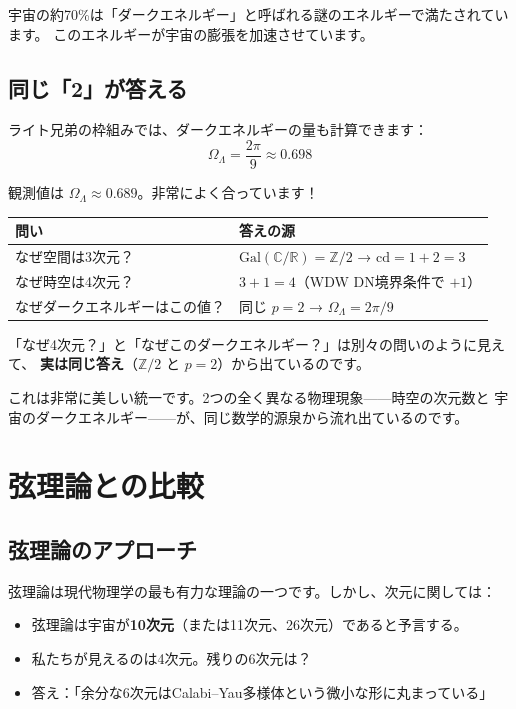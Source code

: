 \documentclass[12pt,a4paper]{article}
\begin{document}
宇宙の約70\%は「ダークエネルギー」と呼ばれる謎のエネルギーで満たされています。
このエネルギーが宇宙の膨張を加速させています。

\subsection{同じ「2」が答える}

ライト兄弟の枠組みでは、ダークエネルギーの量も計算できます：
\[
  \Omega_\Lambda = \frac{2\pi}{9} \approx 0.698
\]

観測値は $\Omega_\Lambda \approx 0.689$。非常によく合っています！

\begin{keypoint}[統一的な答え]
\begin{center}
\begin{tabular}{ll}
\toprule
\textbf{問い} & \textbf{答えの源} \\
\midrule
なぜ空間は3次元？ & $\mathrm{Gal}(\mathbb{C}/\mathbb{R}) = \mathbb{Z}/2$
→ $\mathrm{cd} = 1+2 = 3$ \\
なぜ時空は4次元？ & $3 + 1 = 4$（WDW DN境界条件で $+1$）\\
なぜダークエネルギーはこの値？ & 同じ $p=2$ → $\Omega_\Lambda = 2\pi/9$ \\
\bottomrule
\end{tabular}
\end{center}

「なぜ4次元？」と「なぜこのダークエネルギー？」は別々の問いのように見えて、
\textbf{実は同じ答え}（$\mathbb{Z}/2$ と $p=2$）から出ているのです。
\end{keypoint}

これは非常に美しい統一です。2つの全く異なる物理現象——時空の次元数と
宇宙のダークエネルギー——が、同じ数学的源泉から流れ出ているのです。

\section{弦理論との比較}

\subsection{弦理論のアプローチ}

弦理論は現代物理学の最も有力な理論の一つです。しかし、次元に関しては：

\begin{itemize}
  \item 弦理論は宇宙が\textbf{10次元}（または11次元、26次元）であると予言する。
  \item 私たちが見えるのは4次元。残りの6次元は？
  \item 答え：「余分な6次元はCalabi--Yau多様体という微小な形に丸まっている」
\end{itemize}
\end{document}
